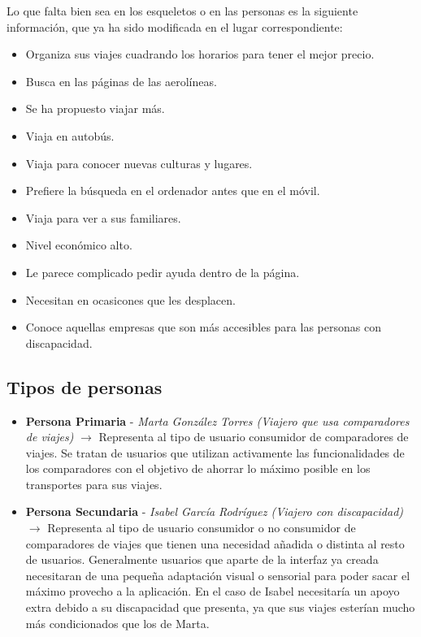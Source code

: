 Lo que falta bien sea en los esqueletos o en las personas es la siguiente información, que ya ha sido modificada en el lugar correspondiente:
\begin{itemize}
    \item Organiza sus viajes cuadrando los horarios para tener el mejor precio.
    \item Busca en las páginas de las aerolíneas.
    \item Se ha propuesto viajar más.
    \item Viaja en autobús.
    \item Viaja para conocer nuevas culturas y lugares.
    \item Prefiere la búsqueda en el ordenador antes que en el móvil.
    \item Viaja para ver a sus familiares.
    \item Nivel económico alto.
    \item Le parece complicado pedir ayuda dentro de la página.
    \item Necesitan en ocasicones que les desplacen.
    \item Conoce aquellas empresas que son más accesibles para las personas con discapacidad.
\end{itemize}

\subsection{Tipos de personas}
\begin{itemize}
    \item \textbf{Persona Primaria} - \textit{Marta González Torres (Viajero que usa comparadores de viajes)} $\rightarrow$ Representa al tipo de usuario consumidor de comparadores de viajes. Se tratan de usuarios que utilizan activamente las funcionalidades de los comparadores con el objetivo de ahorrar lo máximo posible en los transportes para sus viajes.
    \item \textbf{Persona Secundaria} - \textit{Isabel García Rodríguez (Viajero con discapacidad)} $\rightarrow$ Representa al tipo de usuario consumidor o no consumidor de comparadores de viajes que tienen una necesidad añadida o distinta al resto de usuarios. 
    Generalmente usuarios que aparte de la interfaz ya creada necesitaran de una pequeña adaptación visual o sensorial para poder sacar el máximo provecho a la aplicación. En el caso de Isabel necesitaría un apoyo extra debido a su discapacidad que presenta, ya que sus viajes esterían mucho más condicionados que los de Marta.
\end{itemize}